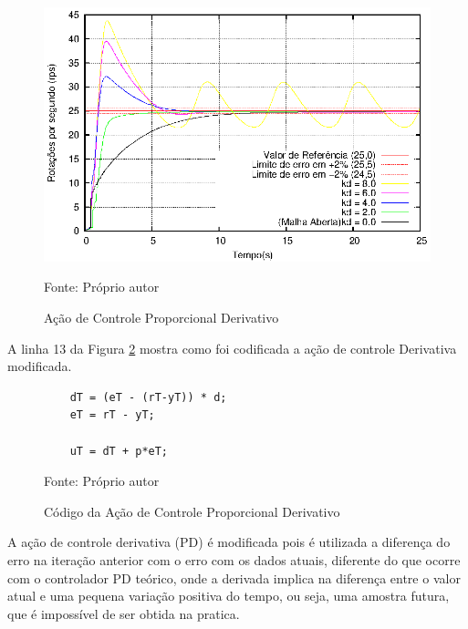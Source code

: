 \begin{figure}[!htb]
\centering
\caption{Ação de Controle Proporcional Derivativo}
\center\includegraphics[scale=1.1]{./imagens/acaoPD.eps}
\label{fig:acaoPD}

{\small Fonte: Próprio autor}
\end{figure}

 A linha 13 da Figura \ref{fig:codigoControladorPD} mostra como foi codificada a ação de controle Derivativa modificada.

\begin{figure}[!htb]
\centering
\caption{Código da Ação de Controle Proporcional Derivativo}
\begin{minipage}{0.8\linewidth}
\lstset{firstnumber=13}
\begin{lstlisting}
    dT = (eT - (rT-yT)) * d;
    eT = rT - yT;

    uT = dT + p*eT;
\end{lstlisting}
\end{minipage}
\label{fig:codigoControladorPD}

{\small Fonte: Próprio autor}
\end{figure}

A ação de controle derivativa (PD) é modificada pois é utilizada a diferença do erro na iteração anterior com o erro com os dados atuais, diferente do que ocorre com o controlador PD teórico, onde a derivada implica na diferença entre o valor atual e uma pequena variação positiva do tempo, ou seja, uma amostra futura, que é impossível de ser obtida na pratica. 










